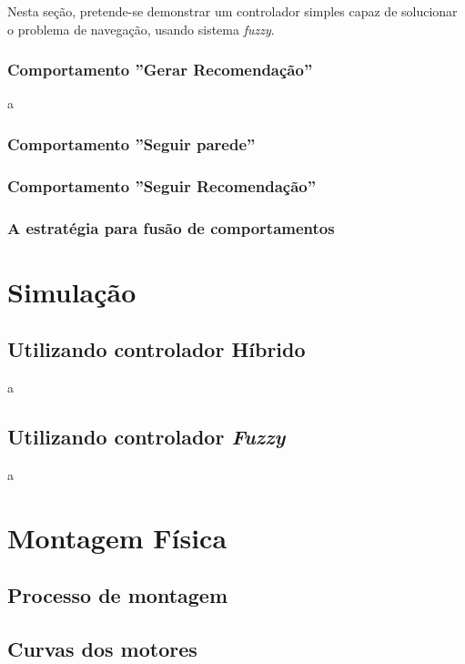 	Nesta seção, pretende-se demonstrar um controlador simples capaz de solucionar 
	o problema de navegação, usando sistema \textit{fuzzy}.
	
	\subsubsection{Comportamento ''Gerar Recomendação''}
	
	a
	
	\subsubsection{Comportamento ''Seguir parede''}
	
	\subsubsection{Comportamento ''Seguir Recomendação''}
	
	\subsubsection{A estratégia para fusão de comportamentos}
	
\section{Simulação}

	\subsection{Utilizando controlador Híbrido}
	
	a
	
	\subsection{Utilizando controlador \textit{Fuzzy}}
	
	a
	
\section{Montagem Física}

	\subsection{Processo de montagem}

	\subsection{Curvas dos motores}

